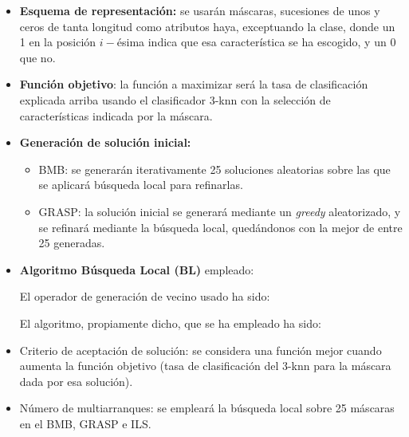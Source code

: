 \documentclass[a4paper,11pt]{article}
\begin{document}
\begin{itemize} 
\item \textbf{Esquema de representación:} se usarán máscaras, sucesiones de unos y ceros de tanta longitud como atributos haya,
exceptuando la clase, donde un 1 en la posición $i-$ésima indica que esa característica se ha escogido, y un $0$ que no.

\item \textbf{Función objetivo}: la función a maximizar será la tasa de clasificación explicada arriba usando el clasificador
3-knn con la selección de características indicada por la máscara.\\

\small\texttt{}

\item \textbf{Generación de solución inicial: }
  \begin{itemize}
   \item BMB: se generarán iterativamente 25 soluciones aleatorias sobre las que se aplicará búsqueda local
   para refinarlas.\\
   
    \small\texttt{}
   
   \item GRASP: la solución inicial se generará mediante un \textit{greedy} aleatorizado, y se refinará mediante
   la búsqueda local, quedándonos con la mejor de entre 25 generadas.\\
   
   \small\texttt{}
  \end{itemize}


\item \textbf{Algoritmo Búsqueda Local (BL)} empleado:
  
  El operador de generación de vecino usado ha sido:\\
  
  \small\texttt{}
  
  El algoritmo, propiamente dicho, que se ha empleado ha sido:\\
  
  \small\texttt{}

\item Criterio de aceptación de solución: se considera una función mejor cuando aumenta la función objetivo (tasa de 
clasificación del 3-knn para la máscara dada por esa solución).
  
\item Número de multiarranques: se empleará la búsqueda local sobre 25 máscaras en el BMB, GRASP e ILS.

\end{itemize}
\end{document}
